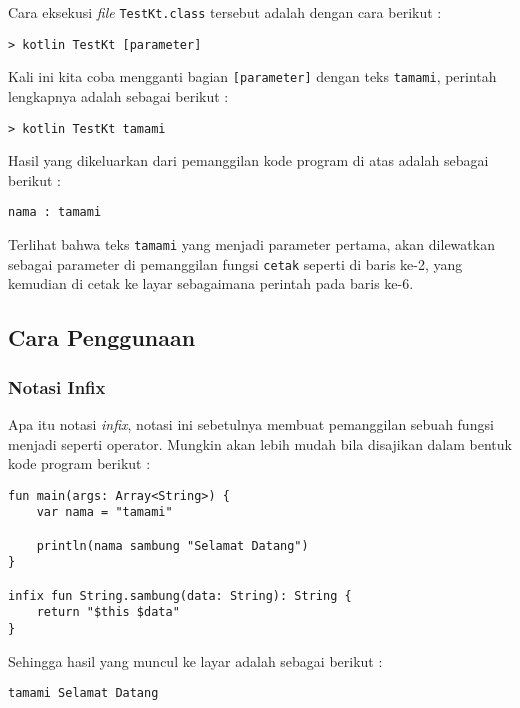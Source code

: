 Cara eksekusi \textit{file} \texttt{TestKt.class} tersebut adalah dengan cara berikut :

\begin{lstlisting}
> kotlin TestKt [parameter]
\end{lstlisting}

Kali ini kita coba mengganti bagian \texttt{[parameter]} dengan teks \texttt{tamami}, perintah lengkapnya adalah sebagai berikut :

\begin{lstlisting}
> kotlin TestKt tamami
\end{lstlisting}

Hasil yang dikeluarkan dari pemanggilan kode program di atas adalah sebagai berikut :

\begin{lstlisting}
nama : tamami
\end{lstlisting}

Terlihat bahwa teks \texttt{tamami} yang menjadi parameter pertama, akan dilewatkan sebagai parameter di pemanggilan fungsi \texttt{cetak} seperti di baris ke-2, yang kemudian di cetak ke layar sebagaimana perintah pada baris ke-6.

\subsection{Cara Penggunaan}

\subsubsection{Notasi Infix}

Apa itu notasi \textit{infix}, notasi ini sebetulnya membuat pemanggilan sebuah fungsi menjadi seperti operator. Mungkin akan lebih mudah bila disajikan dalam bentuk kode program berikut :

\begin{lstlisting}
fun main(args: Array<String>) {
	var nama = "tamami"
	
	println(nama sambung "Selamat Datang")
}

infix fun String.sambung(data: String): String {
	return "$this $data"
}
\end{lstlisting}

Sehingga hasil yang muncul ke layar adalah sebagai berikut :

\begin{lstlisting}
tamami Selamat Datang
\end{lstlisting}

